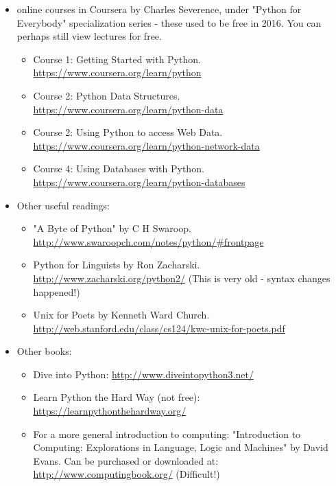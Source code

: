 \documentclass[11pt,a4paper]{article}
\begin{document}
\begin{itemize}
     \item online courses in Coursera by Charles Severence, under "Python for Everybody" specialization series - these used to be free in 2016. You can perhaps still view lectures for free. 
   \begin{itemize}
    \item Course 1: Getting Started with Python. \\ \url{https://www.coursera.org/learn/python}
    \item Course 2: Python Data Structures. \\ \url{https://www.coursera.org/learn/python-data}
    \item Course 2: Using Python to access Web Data. \\ \url{https://www.coursera.org/learn/python-network-data}
    \item Course 4: Using Databases with Python. \\ \url{https://www.coursera.org/learn/python-databases}
   \end{itemize}
   
   \item Other useful readings:
   \begin{itemize}
    \item "A Byte of Python" by C H Swaroop. \\ \url{http://www.swaroopch.com/notes/python/#frontpage}
    \item Python for Linguists by Ron Zacharski. \\ \url{http://www.zacharski.org/python2/} (This is very old - syntax changes happened!)
   \item Unix for Poets by Kenneth Ward Church. \\ \url{http://web.stanford.edu/class/cs124/kwc-unix-for-poets.pdf}
   \end{itemize}
  
  \item Other books:
  \begin{itemize}
  \item Dive into Python: \url{http://www.diveintopython3.net/}
   \item Learn Python the Hard Way (not free): \url{https://learnpythonthehardway.org/}
   \item For a more general introduction to computing: "Introduction to Computing: Explorations in Language, Logic and Machines" by David Evans. Can be purchased or downloaded at: \\ \url{http://www.computingbook.org/} (Difficult!)
  \end{itemize}


\end{itemize}
\end{document}
